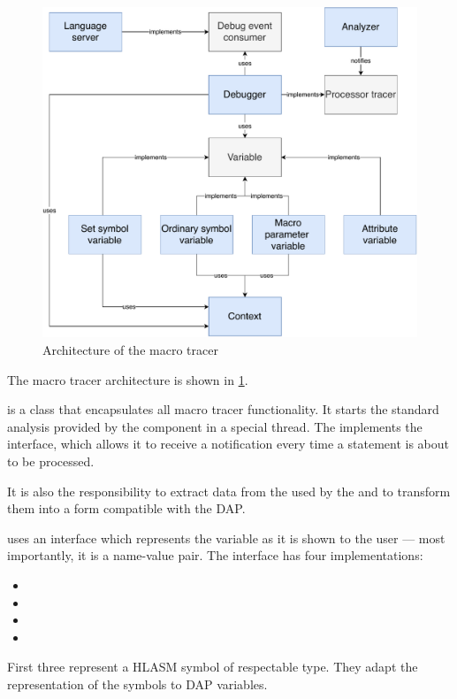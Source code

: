 \begin{figure}
	\centering
	\includegraphics[width=\textwidth]{img/macro_tracer_arch}
	\caption{Architecture of the macro tracer}
	\label{macro_tracer_arch}
\end{figure}

The macro tracer architecture is shown in \cref{macro_tracer_arch}.

 is a class that encapsulates all macro tracer functionality. It starts the standard analysis provided by the  component in a special thread. The  implements the  interface, which allows it to receive a notification every time a statement is about to be processed.

It is also the  responsibility to extract data from the  used by the  and to transform them into a form compatible with the DAP.

 uses an interface  which represents the variable as it is shown to the user --- most importantly, it is a name-value pair. The  interface has four implementations:
\begin{itemize}
	\item {} 
	\item {} 
	\item {} 
	\item {} 
\end{itemize}
First three represent a HLASM symbol of respectable type. They adapt the  representation of the symbols to DAP variables.

